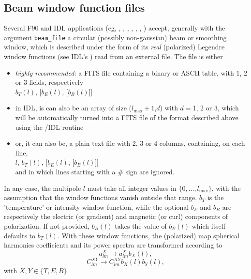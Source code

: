 \documentclass[12pt,twoside]{article}
\renewcommand{\ell}{l}
\newcommand{\lmax}{\ell_{\mathrm{max}}}
\begin{document}
\subsection{Beam window function files}
\label{fac:subsec:beamfiles}
Several F90 and IDL applications (eg,
, 
, 
, 
, 
, 
, 
)
accept, generally with the argument {\tt beam\_file} a circular (possibly non-gaussian) beam or smoothing window,
which is described under the form of its {\em real} (polarized) Legendre window functions
(see IDL's )
read from an external file.\label{page:beamfiles}
The file is either 
\begin{itemize}
\item 
{\em highly recommended:} a FITS file containing a binary or ASCII table, with 1, 2 or 3 fields, respectively\\
$b_T(\ell)$, [$b_E(\ell)$, [$b_B(\ell)$]]\\
\item 
 in IDL, is can also be an array of size ($\lmax+1$,$d$) with $d=$1, 2 or 3, which will be 
automatically turned into a FITS file of the format described above using the 
\healpixns/IDL routine 
\item 
or, it can also be, a plain text file with 2, 3 or 4 columns, containing, on each line,  \\
$\ell$, $b_T(\ell)$, [$b_E(\ell)$, [$b_B(\ell)$]]\\ 
and in which lines starting with a \# sign are ignored.
\end{itemize}
In any case, 
the multipole $\ell$ must take all integer values in $\{0,\ldots,\lmax\}$, 
with the assumption that the window functions vanish outside that range.
$b_T$ is the 'temperature' or intensity window function, 
while the optional $b_E$ and $b_B$ are respectively the electric (or gradient) and
magnetic (or curl) components of polarization.
If not provided, $b_B(\ell)$ takes the value of $b_E(\ell)$ which itself defaults to $b_T(\ell)$.
With these window functions, the (polarized) 
map spherical harmonics coefficients and its power spectra are transformed according to
\begin{equation}
	a^{X}_{\ell m} \longrightarrow a^{X}_{\ell m} b_{X}(\ell),
\end{equation}
\begin{equation}
	C^{XY}_{\ell m} \longrightarrow C^{XY}_{\ell m} b_{X}(\ell)b_{Y}(\ell),
\end{equation}
with $X,Y \in \{T,E,B\}$.
\end{document}
